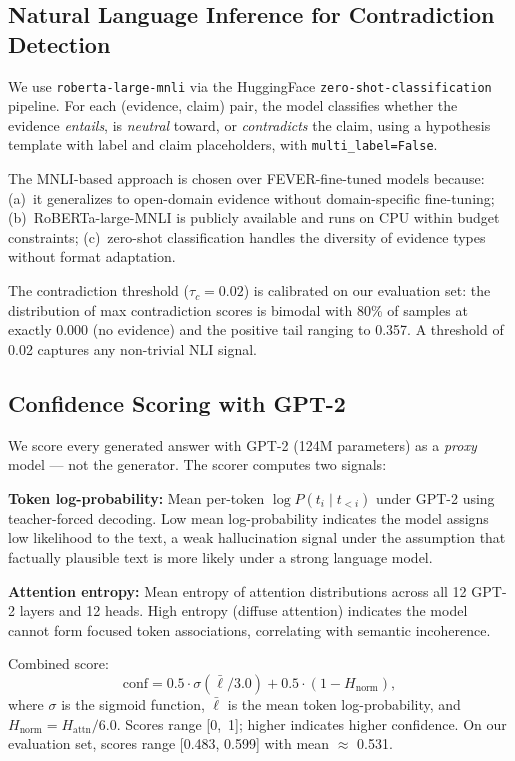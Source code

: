\documentclass[11pt,a4paper]{article}
\newcommand{\tauC}{\tau_c}
\begin{document}
\subsection{Natural Language Inference for Contradiction Detection}

We use \texttt{roberta-large-mnli} \citep{liu2019roberta} via the HuggingFace
\texttt{zero-shot-classification} pipeline. For each (evidence, claim) pair, the
model classifies whether the evidence \emph{entails}, is \emph{neutral} toward,
or \emph{contradicts} the claim, using a hypothesis template with label and
claim placeholders, with \texttt{multi\_label=False}.

The MNLI-based approach is chosen over FEVER-fine-tuned models
\citep{thorne2018fever} because: (a)~it generalizes to open-domain evidence
without domain-specific fine-tuning; (b)~RoBERTa-large-MNLI is publicly
available and runs on CPU within budget constraints; (c)~zero-shot classification
handles the diversity of evidence types without format adaptation.

The contradiction threshold ($\tauC = 0.02$) is calibrated on our evaluation
set: the distribution of max contradiction scores is bimodal with 80\% of
samples at exactly 0.000 (no evidence) and the positive tail ranging to 0.357.
A threshold of 0.02 captures any non-trivial NLI signal.

\subsection{Confidence Scoring with GPT-2}

We score every generated answer with GPT-2 (124M parameters) as a \emph{proxy}
model --- not the generator. The scorer computes two signals:

\textbf{Token log-probability:} Mean per-token $\log P(t_i \mid t_{<i})$ under
GPT-2 using teacher-forced decoding. Low mean log-probability indicates the
model assigns low likelihood to the text, a weak hallucination signal under the
assumption that factually plausible text is more likely under a strong language
model.

\textbf{Attention entropy:} Mean entropy of attention distributions across all
12 GPT-2 layers and 12 heads. High entropy (diffuse attention) indicates the
model cannot form focused token associations, correlating with semantic
incoherence.

Combined score:
\begin{equation}
\text{conf} = 0.5 \cdot \sigma\!\left(\bar{\ell}/3.0\right)
            + 0.5 \cdot \left(1 - H_\text{norm}\right),
\label{eq:conf}
\end{equation}
where $\sigma$ is the sigmoid function, $\bar{\ell}$ is the mean token
log-probability, and $H_\text{norm} = H_\text{attn}/6.0$. Scores range [0,~1];
higher indicates higher confidence. On our evaluation set, scores range
[0.483, 0.599] with mean $\approx$ 0.531.
\end{document}
